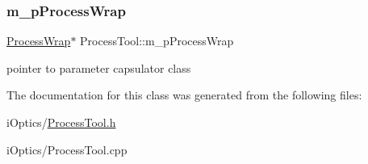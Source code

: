 \subsubsection{\texorpdfstring{m\+\_\+p\+Process\+Wrap}{m\_pProcessWrap}}
{\footnotesize\ttfamily \mbox{\hyperlink{class_process_wrap}{Process\+Wrap}}$\ast$ Process\+Tool\+::m\+\_\+p\+Process\+Wrap\hspace{0.3cm}{\ttfamily [protected]}}

pointer to parameter capsulator class 

The documentation for this class was generated from the following files\+:\begin{DoxyCompactItemize}
\item 
i\+Optics/\mbox{\hyperlink{_process_tool_8h}{Process\+Tool.\+h}}\item 
i\+Optics/Process\+Tool.\+cpp\end{DoxyCompactItemize}

